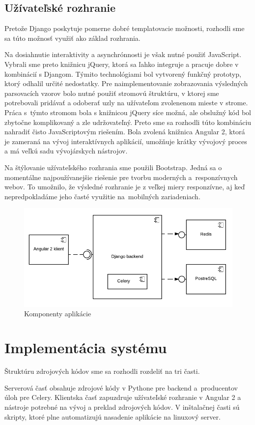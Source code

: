 \subsection{Užívateľské rozhranie}
Pretože Django poskytuje pomerne dobré templatovacie možnosti, rozhodli sme sa túto možnosť využiť ako základ rozhrania.
\par Na dosiahnutie interaktivity a asynchrónnosti je však nutné použiť JavaScript. Vybrali sme preto knižnicu jQuery, ktorá sa ľahko integruje a pracuje dobre v kombinácií s Djangom. Týmito technológiami bol vytvorený funkčný prototyp, ktorý odhalil určité nedostatky. Pre naimplementovanie zobrazovania výsledných parsovacích vzorov bolo nutné použiť stromovú štruktúru, v ktorej sme potrebovali pridávať a odoberať uzly na užívateľom zvolenenom mieste v strome. Práca s~týmto stromom bola s knižnicou jQuery síce možná, ale obslužný kód bol zbytočne komplikovaný a zle udržovateľný. Preto sme sa rozhodli túto kombináciu nahradiť čisto JavaScriptovým riešením. Bola zvolená knižnica Angular 2, ktorá je zameraná na vývoj interaktívnych aplikácií, umožňuje krátky vývojový proces a má veľkú sadu vývojárskych nástrojov.
\par Na štýlovanie užívateľského rozhrania sme použili Bootstrap. Jedná sa o momentálne najpoužívanejšie riešenie pre tvorbu moderných a~responzívnych webov. To umožnilo, že výsledné rozhranie je z veľkej miery responzívne, aj keď nepredpokladáme jeho časté využitie na~mobilných zariadeniach.

\begin{figure}[htbp]
 \centering 
 \begin{minipage}{0.95\linewidth}
 	\centering
 	\includegraphics[width=\textwidth]{Images/thesis-component-diagram.pdf}	
 \end{minipage}
  \caption{Komponenty aplikácie }
  \label{fig:components}
\end{figure}

\newpage
\section{Implementácia systému}
Štruktúru zdrojových kódov sme sa rozhodli rozdeliť na tri časti.
\par Serverová časť obsahuje zdrojové kódy v Pythone pre backend a~producentov úloh pre Celery. Klientska časť zapuzdruje užívateľské rozhranie v Angular 2 a nástroje potrebné na vývoj a preklad zdrojových kódov. V inštalačnej časti sú skripty, ktoré plne automatizujú nasadenie aplikácie na linuxový server.